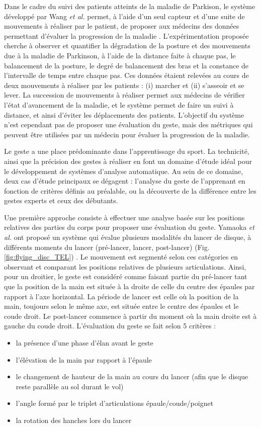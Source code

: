 Dans le cadre du suivi des patients atteints de la maladie de Parkison, le système développé par Wang \textit{et al.} permet, à l'aide d'un seul capteur et d'une suite de mouvements à réaliser par le patient, de proposer aux médecins des données permettant d'évaluer la progression de la maladie \parencite{Wang2013HMM}. L'expérimentation proposée cherche à observer et quantifier la dégradation de la posture et des mouvements due à la maladie de Parkinson, à l'aide de la distance faite à chaque pas, le balancement de la posture, le degré de balancement des bras et la constance de l'intervalle de temps entre chaque pas. Ces données étaient relevées au cours de deux mouvements à réaliser par les patients : (i) marcher et (ii) s'asseoir et se lever. La succession de mouvements à réaliser permet aux médecins de vérifier l'état d'avancement de la maladie, et le système permet de faire un suivi à distance, et ainsi d'éviter les déplacements des patients. L'objectif du système n'est cependant pas de proposer une évaluation du geste, mais des métriques qui peuvent être utilisées par un médecin pour évaluer la progression de la maladie.

Le geste a une place prédominante dans l'apprentissage du sport. La technicité, ainsi que la précision des gestes à réaliser en font un domaine d'étude idéal pour le développement de systèmes d'analyse automatique. Au sein de ce domaine, deux cas d'étude principaux se dégagent : l'analyse du geste de l'apprenant en fonction de critères définis au préalable, ou la découverte de la différence entre les gestes experts et ceux des débutants.

Une première approche consiste à effectuer une analyse basée sur les positions relatives des parties du corps pour proposer une évaluation du geste. Yamaoka \textit{et al.} ont proposé un système qui évalue plusieurs modalités du lancer de disque, à différents moments du lancer (pré-lancer, lancer, post-lancer) (Fig. \ref{fig:flying_disc_TEL}) \parencite{Yamaoka2013FoF}. Le mouvement est segmenté selon ces catégories en observant et comparant les positions relatives de plusieurs articulations. Ainsi, pour un droitier, le geste est considéré comme faisant partie du pré-lancer tant que la position de la main est située à la droite de  celle du centre des épaules par rapport à l'axe horizontal. La période de lancer est celle où la position de la main, toujours selon le même axe, est située entre le centre des épaules et le coude droit. Le post-lancer commence à partir du moment où la main droite est à gauche du coude droit. L'évaluation du geste se fait selon 5 critères :
\begin{itemize}
	\item la présence d'une phase d'élan avant le geste
	\item l'élévation de la main par rapport à l'épaule
	\item le changement de hauteur de la main au cours du lancer (afin que le disque reste parallèle au sol durant le vol)
	\item l'angle formé par le triplet d'articulations épaule/coude/poignet
	\item la rotation des hanches lors du lancer
\end{itemize}

